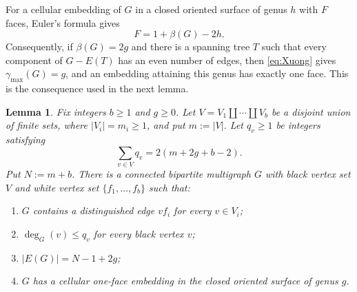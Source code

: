 \documentclass[11pt]{amsart}
\theoremstyle{definition}
\theoremstyle{plain}
\newtheorem{lemma}[lemma]{Lemma}
\theoremstyle{definition}
\theoremstyle{definition}
\begin{document}
For a cellular embedding of $G$ in a closed oriented surface of genus $h$ with $F$ faces, Euler's formula gives
\[
  F=1+\beta(G)-2h.
\]
Consequently, if $\beta(G)=2g$ and there is a spanning tree $T$ such
that every component of $G-E(T)$ has an even number of edges, then
\eqref{eq:Xuong} gives $\gamma_{\max}(G)=g$, and an embedding attaining
this genus has exactly one face.  This is the consequence used in
the next lemma.

\begin{lemma}
\label{lem:capacity-core}
Fix integers $b\geq1$ and $g\geq0$. Let
$V=V_1\amalg\cdots\amalg V_b$ be a disjoint union of finite sets, where $|V_i|=m_i\geq1$, and put
$m:=|V|$.  Let $q_v\geq1$ be integers satisfying
\begin{equation}
\label{eq:core-degree-sum}
 \sum_{v\in V}q_v=2(m+2g+b-2).
\end{equation}  Put $N:=m+b$.  There is a connected bipartite multigraph
$G$ with black vertex set $V$ and white vertex set
$\{f_1,\ldots,f_b\}$ such that:
\begin{enumerate}[label=\textup{(\roman*)}]
\item $G$ contains a distinguished edge $vf_i$ for every $v\in V_i$;
\item $\deg_G(v)\leq q_v$ for every black vertex $v$;
\item $|E(G)|=N-1+2g$;
\item $G$ has a cellular one-face embedding in the closed oriented surface
of genus $g$.
\end{enumerate}
\end{lemma}
\end{document}
